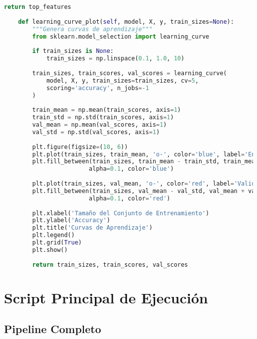 \begin{lstlisting}[language=Python, caption=Módulo de evaluación de modelos]
        return top_features
    
    def learning_curve_plot(self, model, X, y, train_sizes=None):
        """Genera curvas de aprendizaje"""
        from sklearn.model_selection import learning_curve
        
        if train_sizes is None:
            train_sizes = np.linspace(0.1, 1.0, 10)
        
        train_sizes, train_scores, val_scores = learning_curve(
            model, X, y, train_sizes=train_sizes, cv=5, 
            scoring='accuracy', n_jobs=-1
        )
        
        train_mean = np.mean(train_scores, axis=1)
        train_std = np.std(train_scores, axis=1)
        val_mean = np.mean(val_scores, axis=1)
        val_std = np.std(val_scores, axis=1)
        
        plt.figure(figsize=(10, 6))
        plt.plot(train_sizes, train_mean, 'o-', color='blue', label='Entrenamiento')
        plt.fill_between(train_sizes, train_mean - train_std, train_mean + train_std, 
                        alpha=0.1, color='blue')
        
        plt.plot(train_sizes, val_mean, 'o-', color='red', label='Validación')
        plt.fill_between(train_sizes, val_mean - val_std, val_mean + val_std, 
                        alpha=0.1, color='red')
        
        plt.xlabel('Tamaño del Conjunto de Entrenamiento')
        plt.ylabel('Accuracy')
        plt.title('Curvas de Aprendizaje')
        plt.legend()
        plt.grid(True)
        plt.show()
        
        return train_sizes, train_scores, val_scores
\end{lstlisting}

\section{Script Principal de Ejecución}

\subsection{Pipeline Completo}

